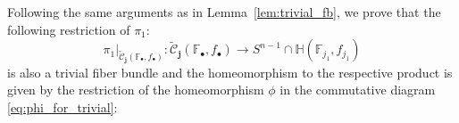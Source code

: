 \begin{remark}\label{rem:trivial_fb_interior} Following the same arguments as in Lemma~\ref{lem:trivial_fb}, we prove that the following restriction of $\pi_1$: \[\pi_1|_{\tilde{\mathcal{C}}_{\mathbf{j}}(\mathbb{F}_{\bullet},f_{\bullet})}:\tilde{\mathcal{C}}_{\mathbf{j}}(\mathbb{F}_{\bullet},f_{\bullet})\to S^{n-1}\cap\mathbb{H}(\mathbb{F}_{j_1},f_{j_1})\]
is also a trivial fiber bundle and the homeomorphism to the respective product is given by the restriction of the homeomorphism $\phi$ in the commutative diagram \eqref{eq:phi_for_trivial}:
\begin{center}
\end{center}
\end{remark}


